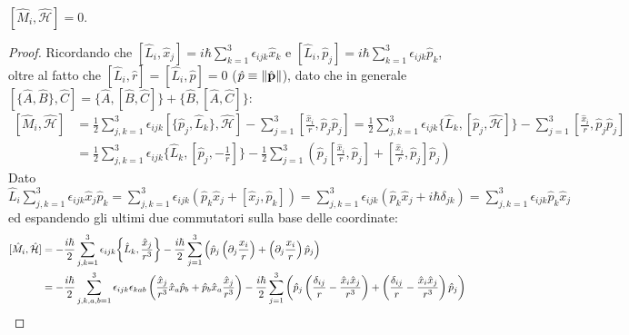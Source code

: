 \begin{proposition}
	$ [\hat{M}_i, \hat{\mathcal{H}}] = 0 $.
\end{proposition}
\begin{proof}
	Ricordando che $ [\hat{L}_i,\hat{x}_j] = i\hbar \sum_{k = 1}^{3} \epsilon_{ijk} \hat{x}_k $ e $ [\hat{L}_i,\hat{p}_j] = i\hbar \sum_{k = 1}^{3} \epsilon_{ijk} \hat{p}_k $, oltre al fatto che $ [\hat{L}_i, \hat{r}] = [\hat{L}_i, \hat{p}] = 0 $ ($ \hat{p} \equiv \left\lVert\hat{\mathbf{p}}\right\rVert $), dato che in generale $ [\{\hat{A},\hat{B}\},\hat{C}] = \{\hat{A},[\hat{B},\hat{C}]\} + \{\hat{B},[\hat{A},\hat{C}]\} $:
	\begin{equation*}
		\begin{split}
			[\hat{M}_i,\hat{\mathcal{H}}]
			&= \frac{1}{2} \sum_{j,k = 1}^{3} \epsilon_{ijk} [\{\hat{p}_j,\hat{L}_k\}, \hat{\mathcal{H}}] - \sum_{j = 1}^{3} \left[ \frac{\hat{x}_i}{r}, \hat{p}_j \hat{p}_j \right] = \frac{1}{2} \sum_{j,k = 1}^{3} \epsilon_{ijk} \{\hat{L}_k,[\hat{p}_j,\hat{\mathcal{H}}]\} - \sum_{j = 1}^{3} \left[ \frac{\hat{x}_i}{r}, \hat{p}_j\hat{p}_j \right] \\
			&= \frac{1}{2} \sum_{j,k = 1}^{3} \epsilon_{ijk} \bigg\{ \hat{L}_k, \left[\hat{p}_j, - \frac{1}{r}\right] \bigg\} - \frac{1}{2} \sum_{j = 1}^{3} \left( \hat{p}_j \left[ \frac{\hat{x}_i}{r}, \hat{p}_j \right] + \left[ \frac{\hat{x}_i}{r}, \hat{p}_j \right] \hat{p}_j \right)
		\end{split}
	\end{equation*}
	Dato $ \hat{L}_i \sum_{j,k = 1}^{3} \epsilon_{ijk} \hat{x}_j \hat{p}_k = \sum_{j,k = 1}^{3} \epsilon_{ijk} \left( \hat{p}_k \hat{x}_j + [\hat{x}_j,\hat{p}_k] \right) = \sum_{j,k = 1}^{3} \epsilon_{ijk} \left( \hat{p}_k \hat{x}_j + i\hbar \delta_{jk} \right) = \sum_{j,k = 1}^{3} \epsilon_{ijk} \hat{p}_k \hat{x}_j $ ed espandendo gli ultimi due commutatori sulla base delle coordinate:
	\begin{equation*}
		\begin{split}
			[\hat{M}_i, \hat{\mathcal{H}}]
			&= -\frac{i\hbar}{2} \sum_{j,k = 1}^{3} \epsilon_{ijk} \bigg\{ \hat{L}_k, \frac{\hat{x}_j}{r^3} \bigg\} - \frac{i\hbar}{2} \sum_{j = 1}^{3} \left( \hat{p}_j \left( \pa_j \frac{x_i}{r} \right) + \left( \pa_j \frac{x_i}{r} \right) \hat{p}_j \right) \\
			&= -\frac{i\hbar}{2} \sum_{j,k,a,b = 1}^{3} \epsilon_{ijk} \epsilon_{kab} \left( \frac{\hat{x}_j}{r^3} \hat{x}_a \hat{p}_b + \hat{p}_b \hat{x}_a \frac{\hat{x}_j}{r^3} \right) - \frac{i\hbar}{2} \sum_{j = 1}^{3} \left( \hat{p}_j \left( \frac{\delta_{ij}}{r} - \frac{\hat{x}_i \hat{x}_j}{r^3} \right) + \left( \frac{\delta_{ij}}{r} - \frac{\hat{x}_i \hat{x}_j}{r^3} \right) \hat{p}_j \right) \\

\end{split}
\end{equation*}
\end{proof}
